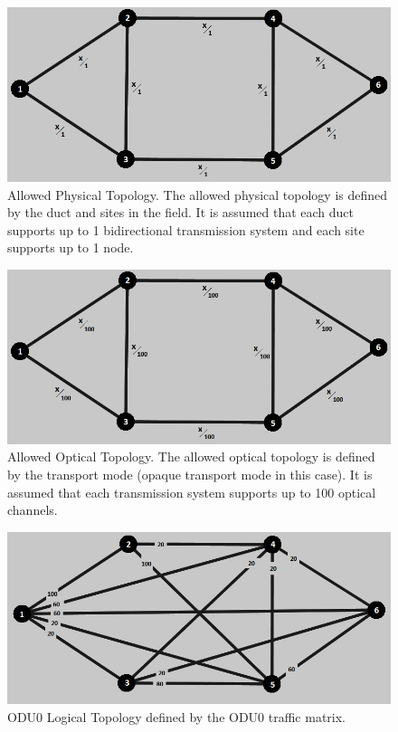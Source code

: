 \begin{figure}[H]
\centering
\includegraphics[width=13cm]{sdf/heuristic/opaque_survivability/high/allowed_physical_high}
\caption{Allowed Physical Topology. The allowed physical topology is defined by the duct and sites in the field. It is assumed that each duct supports up to 1 bidirectional transmission system and each site supports up to 1 node.}
\label{allowed_physical_surv_ref_high_heuristic}
\end{figure}

\begin{figure}[H]
\centering
\includegraphics[width=13cm]{sdf/heuristic/opaque_survivability/high/allowed_optical_high}
\caption{Allowed Optical Topology. The allowed optical topology is defined by the transport mode (opaque transport mode in this case). It is assumed that each transmission system supports up to 100 optical channels.}
\label{allowed_optical_surv_ref_high_heuristic}
\end{figure}

\begin{figure}[H]
\centering
\includegraphics[width=13cm]{sdf/heuristic/opaque_survivability/high/logical_topology_odu0_high}
\caption{ODU0 Logical Topology defined by the ODU0 traffic matrix.}
\label{logical_ODU0_surv_ref_high_heuristic}
\end{figure}

